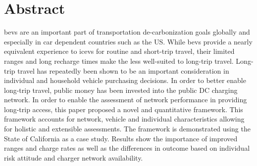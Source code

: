 \section*{Abstract}

\glspl{bev} are an important part of transportation de-carbonization goals globally and especially in car dependent countries such as the US. While \glspl{bev} provide a nearly equivalent experience to \glspl{icev} for routine and short-trip travel, their limited ranges and long recharge times make the less well-suited to long-trip travel. Long-trip travel has repeatedly been shown to be an important consideration in individual and household vehicle purchasing decisions. In order to better enable long-trip travel, public money has been invested into the public DC charging network. In order to enable the assessment of network performance in providing long-trip access, this paper proposed a novel and quantitative framework. This framework accounts for network, vehicle and individual characteristics allowing for holistic and extensible assessments. The framework is demonstrated using the State of California as a case study. Results show the importance of improved ranges and charge rates as well as the differences in outcome based on individual risk attitude and charger network availability.

\medskip